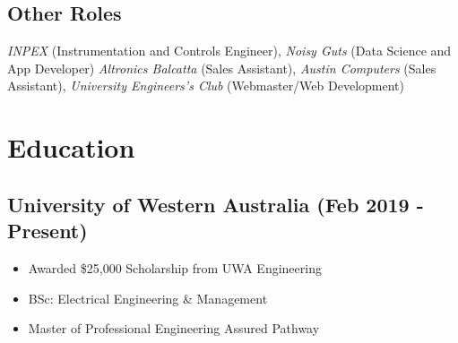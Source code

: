 \documentclass{article}[a4page]
\begin{document}
\subsection*{Other Roles}
\emph{INPEX} (Instrumentation and Controls Engineer), \emph{Noisy Guts} (Data Science and App Developer) \emph{Altronics Balcatta} (Sales Assistant), \emph{Austin Computers} (Sales Assistant), \emph{University Engineers’s Club} (Webmaster/Web Development)

\section*{Education}
\subsection*{University of Western Australia \hfill (Feb 2019 - Present)}
\begin{itemize}
\item Awarded \$25,000 Scholarship from UWA Engineering
\item BSc: Electrical Engineering \& Management
\item Master of Professional Engineering Assured Pathway
\end{itemize}
\end{document}
